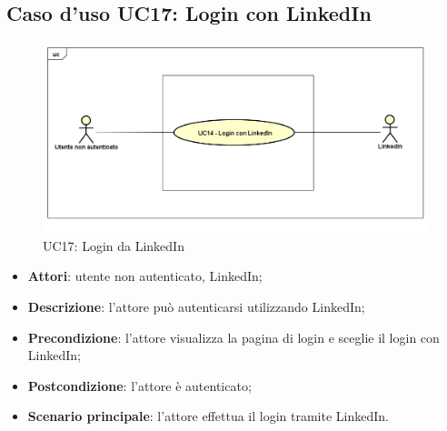 \newpage
\subsection{Caso d'uso UC17: Login con LinkedIn}
\label{UC17}
\begin{figure}[ht]
	\centering
	\includegraphics[scale=0.48]{UML/UC17.png}
	\caption{UC17: Login da LinkedIn}
\end{figure}
\FloatBarrier
\begin{itemize}
	\item \textbf{Attori}: utente non autenticato, LinkedIn;
	\item \textbf{Descrizione}: l'attore può autenticarsi utilizzando LinkedIn;
	\item \textbf{Precondizione}: l'attore visualizza la pagina di login e sceglie il login con LinkedIn;
	\item \textbf{Postcondizione}: l'attore è autenticato;
	\item \textbf{Scenario principale}: l'attore effettua il login tramite LinkedIn.
\end{itemize}